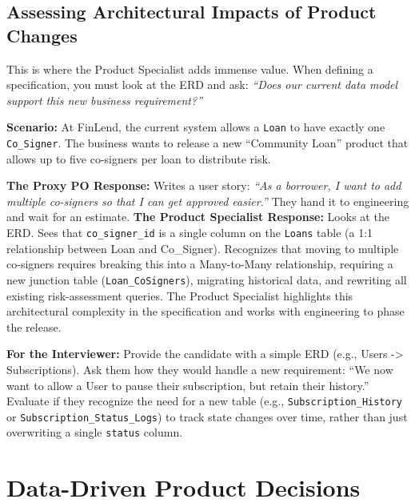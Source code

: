 \documentclass[
  11pt,
  openany,
  oneside]{book}
\renewenvironment{quote}{\begin{customquote}}{\end{customquote}}
\begin{document}
\subsection{Assessing Architectural Impacts of Product
Changes}\label{assessing-architectural-impacts-of-product-changes}

This is where the Product Specialist adds immense value. When defining a
specification, you must look at the ERD and ask: \emph{``Does our
current data model support this new business requirement?''}

\textbf{Scenario:} At FinLend, the current system allows a \texttt{Loan}
to have exactly one \texttt{Co\_Signer}. The business wants to release a
new ``Community Loan'' product that allows up to five co-signers per
loan to distribute risk.

\textbf{The Proxy PO Response:} Writes a user story: \emph{``As a
borrower, I want to add multiple co-signers so that I can get approved
easier.''} They hand it to engineering and wait for an estimate.
\textbf{The Product Specialist Response:} Looks at the ERD. Sees that
\texttt{co\_signer\_id} is a single column on the \texttt{Loans} table
(a 1:1 relationship between Loan and Co\_Signer). Recognizes that moving
to multiple co-signers requires breaking this into a Many-to-Many
relationship, requiring a new junction table (\texttt{Loan\_CoSigners}),
migrating historical data, and rewriting all existing risk-assessment
queries. The Product Specialist highlights this architectural complexity
in the specification and works with engineering to phase the release.

\begin{quote}
\textbf{For the Interviewer:} Provide the candidate with a simple ERD
(e.g., Users -\textgreater{} Subscriptions). Ask them how they would
handle a new requirement: ``We now want to allow a User to pause their
subscription, but retain their history.'' Evaluate if they recognize the
need for a new table (e.g., \texttt{Subscription\_History} or
\texttt{Subscription\_Status\_Logs}) to track state changes over time,
rather than just overwriting a single \texttt{status} column.
\end{quote}

\bigskip

\section{Data-Driven Product
Decisions}\label{data-driven-product-decisions}
\end{document}
